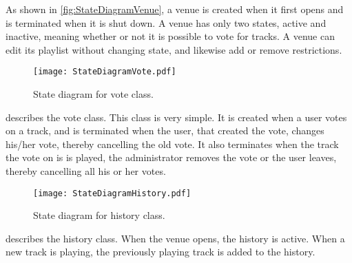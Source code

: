 As shown in \cref{fig:StateDiagramVenue}, a venue is created when it first opens and is terminated when it is shut down. A venue has only two states, active and inactive, meaning whether or not it is possible to vote for tracks. A venue can edit its playlist without changing state, and likewise add or remove restrictions.

\begin{figure}[H]
  \centering
  \texttt{[image: StateDiagramVote.pdf]}
  \caption{State diagram for vote class.}\label{fig:StateDiagramVote}
\end{figure}

 describes the vote class. This class is very simple. It is created when a user votes on a track, and is terminated when the user, that created the vote, changes his/her vote, thereby cancelling the old vote. It also terminates when the track the vote on is is played, the administrator removes the vote or the user leaves, thereby cancelling all his or her votes.

\begin{figure}[H]
  \centering
  \texttt{[image: StateDiagramHistory.pdf]}
  \caption{State diagram for history class.}\label{fig:StateDiagramHistory}
\end{figure}

 describes the history class. When the venue opens, the history is active. When a new track is playing, the previously playing track is added to the history.
